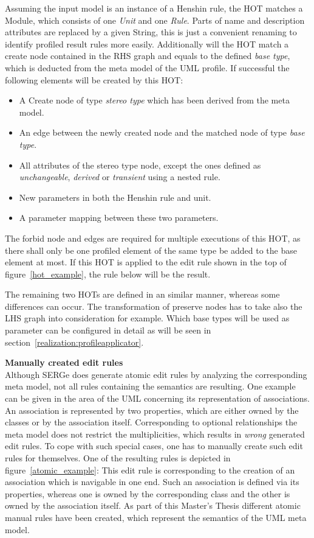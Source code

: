 Assuming the input model is an instance of a Henshin rule, the \ac{HOT} matches
a Module, which consists of one \textit{Unit} and one \textit{Rule}. Parts
of name and description attributes are replaced by a given String, this is just
a convenient renaming to identify profiled result rules more easily.
Additionally will the \ac{HOT} match a create node contained in the
\ac{RHS} graph and equals to the defined \textit{base type}, which is deducted
from the meta model of the \ac{UML} profile. If successful the following
elements will be created by this \ac{HOT}:
\newpage
\begin{itemize}
  \item A Create node of type \textit{stereo type} which has been derived from
  the meta model.
  \item An edge between the newly created node and the matched node of type
  \textit{base type}.
  \item All attributes of the stereo type node, except the ones defined as
  \textit{unchangeable}, \textit{derived} or \textit{transient} using a nested
  rule.
  \item New parameters in both the Henshin rule and unit.
  \item A parameter mapping between these two parameters.
\end{itemize}
The forbid node and edges are required for multiple executions of this \ac{HOT},
as there shall only be one profiled element of the same type be added to the
base element at most. If this \ac{HOT} is applied to the edit rule shown in the top of
figure~\ref{hot_example}, the rule below will be the result.

The remaining two \ac{HOT}s are defined in an similar manner, whereas some
differences can occur. The transformation of preserve nodes has to take also
the \ac{LHS} graph into consideration for example. Which base types will be used
as parameter can be configured in detail as will be seen in
section~\ref{realization:profileapplicator}.

 \textbf{Manually created edit rules}\\
 Although \ac{SERGe} does generate atomic edit rules by analyzing the
 corresponding meta model, not all rules containing the semantics are resulting.
 One example can be given in the area of the \ac{UML} concerning its
 representation of associations. An association is represented by two
 properties, which are either owned by the classes or by the association itself.
 Corresponding to optional relationships the meta model does not restrict the
 multiplicities, which results in \textit{wrong} generated edit rules. To cope
 with such special cases, one has to manually create such edit rules for
 themselves. One of the resulting rules is depicted in
 figure~\ref{atomic_example}: This edit rule is corresponding to the
 creation of an association which is navigable in one end. Such an association
 is defined via its properties, whereas one is owned by the corresponding class
 and the other is owned by the association itself. As part of this Master's
 Thesis different atomic manual rules have been created, which represent the
 semantics of the \ac{UML} meta model.
 
